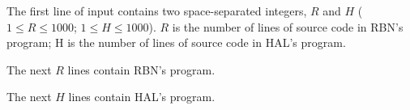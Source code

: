 The first line of input contains two space-separated integers, $R$ and $H$ ($1 \leq  R \leq  1000$; $1 \leq  H \leq  1000$). $R$ is the number of lines of source code in RBN's program; H is the number of lines of source code in HAL's program.

The next $R$ lines contain RBN's program.

The next $H$ lines contain HAL's program.
